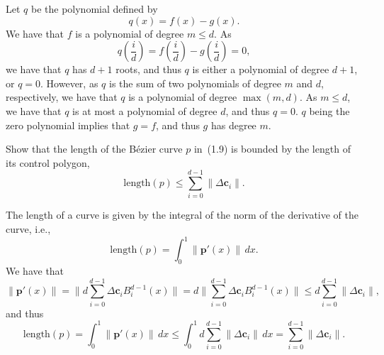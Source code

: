 \begin{solution}
    Let $q$ be the polynomial defined by
    \begin{equation*}
        q(x) = f(x) - g(x).
    \end{equation*}
    We have that $f$ is a polynomial of degree $m \leq d$.
    As
    \begin{equation*}
        q\left(\frac{i}{d}\right) = f\left(\frac{i}{d}\right) - g\left(\frac{i}{d}\right) = 0,
    \end{equation*}
    we have that $q$ has $d+1$ roots, and thus $q$ is either a polynomial of degree $d+1$, or $q = 0$.
    However, as $q$ is the sum of two polynomials of degree $m$ and $d$, respectively, we have that $q$ is a polynomial of degree $\max(m, d)$.
    As $m \leq d$, we have that $q$ is at most a polynomial of degree $d$, and thus $q = 0$.
    $q$ being the zero polynomial implies that $g = f$, and thus $g$ has degree $m$.
\end{solution}

\begin{exercise}
    Show that the length of the Bézier curve $p$ in~(1.9) is bounded by the length of its control polygon,
    \begin{equation*}
        \text{length}(p) \leq \sum_{i = 0}^{d-1} \lVert \Delta \boldsymbol{c}_i \rVert.
    \end{equation*}
\end{exercise}

\begin{solution}
    The length of a curve is given by the integral of the norm of the derivative of the curve, i.e.,
    \begin{equation*}
        \text{length}(p) = \int_0^1 \lVert \boldsymbol{p}'(x) \rVert \, dx.
    \end{equation*}
    We have that
    \begin{equation*}
        \lVert \boldsymbol{p}'(x) \rVert = \lVert d \sum_{i = 0}^{d-1} \Delta \boldsymbol{c}_i B_i^{d-1}(x) \rVert
        = d \lVert \sum_{i = 0}^{d-1} \Delta \boldsymbol{c}_i B_i^{d-1}(x) \rVert
        \leq d \sum_{i = 0}^{d-1} \lVert \Delta \boldsymbol{c}_i \rVert,
    \end{equation*}
    and thus
    \begin{equation*}
        \text{length}(p) = \int_0^1 \lVert \boldsymbol{p}'(x) \rVert \, dx \leq \int_0^1 d \sum_{i = 0}^{d-1} \lVert \Delta \boldsymbol{c}_i \rVert \, dx = \sum_{i = 0}^{d-1} \lVert \Delta \boldsymbol{c}_i \rVert.
    \end{equation*}
\end{solution}